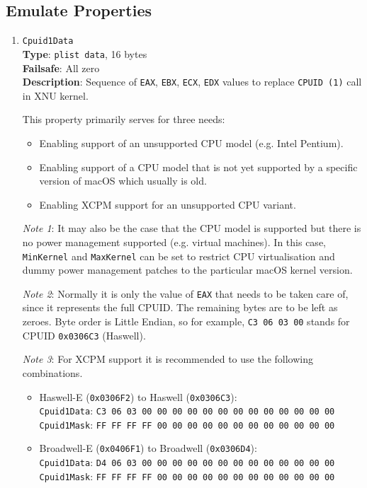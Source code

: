 \documentclass[]{article}
\providecommand{\tightlist}{%
  \setlength{\itemsep}{0pt}\setlength{\parskip}{0pt}}
\begin{document}
\subsection{Emulate Properties}\label{kernelpropsemu}

\begin{enumerate}
\item
  \texttt{Cpuid1Data}\\
  \textbf{Type}: \texttt{plist\ data}, 16 bytes\\
  \textbf{Failsafe}: All zero\\
  \textbf{Description}: Sequence of \texttt{EAX}, \texttt{EBX}, \texttt{ECX},
  \texttt{EDX} values to replace \texttt{CPUID (1)} call in XNU kernel.

  This property primarily serves for three needs:

  \begin{itemize}
    \tightlist
    \item Enabling support of an unsupported CPU model (e.g. Intel Pentium).
    \item Enabling support of a CPU model that is not yet supported by a specific version of macOS which usually is old.
    \item Enabling XCPM support for an unsupported CPU variant.
  \end{itemize}

  \emph{Note 1}: It may also be the case that the CPU model is supported but there is no power management supported
  (e.g. virtual machines). In this case, \texttt{MinKernel} and \texttt{MaxKernel} can be set to restrict CPU virtualisation and dummy power
  management patches to the particular macOS kernel version.

  \emph{Note 2}: Normally it is only the value of \texttt{EAX} that needs to be taken care of,
  since it represents the full CPUID. The remaining bytes are to be left as zeroes.
  Byte order is Little Endian, so for example, \texttt{C3 06 03 00} stands for CPUID
  \texttt{0x0306C3} (Haswell).

  \emph{Note 3}: For XCPM support it is recommended to use the following combinations.

  \begin{itemize}
    \tightlist
    \item Haswell-E (\texttt{0x0306F2}) to Haswell (\texttt{0x0306C3}):\\
    \texttt{Cpuid1Data}: \texttt{C3 06 03 00 00 00 00 00 00 00 00 00 00 00 00 00}\\
    \texttt{Cpuid1Mask}: \texttt{FF FF FF FF 00 00 00 00 00 00 00 00 00 00 00 00}
    \item Broadwell-E (\texttt{0x0406F1}) to Broadwell (\texttt{0x0306D4}):\\
    \texttt{Cpuid1Data}: \texttt{D4 06 03 00 00 00 00 00 00 00 00 00 00 00 00 00}\\
    \texttt{Cpuid1Mask}: \texttt{FF FF FF FF 00 00 00 00 00 00 00 00 00 00 00 00}
  \end{itemize}


\end{enumerate}
\end{document}
